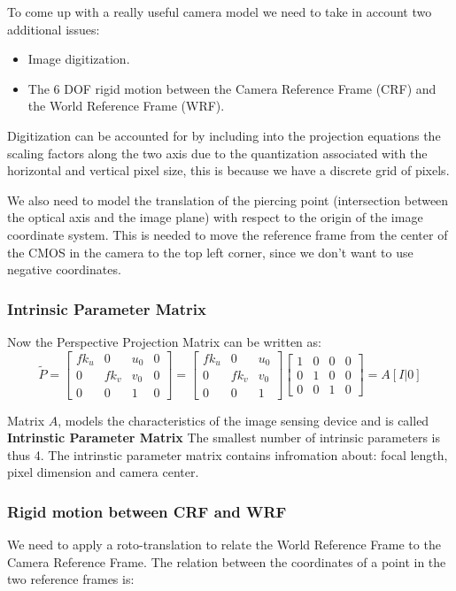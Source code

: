\documentclass{article}
\begin{document}
To come up with a really useful camera model we need to take in account two additional issues:
\begin{itemize}
  \item Image digitization.
  \item The 6 DOF rigid motion between the Camera Reference Frame (CRF) and the World Reference Frame (WRF).
\end{itemize}

Digitization can be accounted for by including into the projection equations the scaling factors along the two axis due to the quantization associated with the horizontal and vertical pixel size, this is because we have a discrete grid of pixels.

We also need to model the translation of the piercing point (intersection between the optical axis and the image plane) with respect to the origin of the image coordinate system.
This is needed to move the reference frame from the center of the CMOS in the camera to the top left corner, since we don't want to use negative coordinates.

\subsubsection{Intrinsic Parameter Matrix}
Now the Perspective Projection Matrix can be written as:
$$
\tilde{P} = 
\begin{bmatrix}
  fk_u & 0 & u_0 & 0 \\
  0 & fk_v & v_0 & 0 \\
  0 & 0 & 1 & 0 
\end{bmatrix}
=
\begin{bmatrix}
  fk_u & 0 & u_0 \\
  0 & fk_v & v_0 \\
  0 & 0 & 1 
\end{bmatrix}
\begin{bmatrix}
  1 & 0 & 0 & 0 \\
  0 & 1 & 0 & 0 \\
  0 & 0 & 1 & 0 
\end{bmatrix}
= A[I|0]
$$

Matrix $A$, models the characteristics of the image sensing device and is called \textbf{Intrinstic Parameter Matrix}
The smallest number of intrinsic parameters is thus 4.
The intrinstic parameter matrix contains infromation about: focal length, pixel dimension and camera center.

\subsubsection{Rigid motion between CRF and WRF}
We need to apply a roto-translation to relate the World Reference Frame to the Camera Reference Frame.
The relation between the coordinates of a point in the two reference frames is:
\end{document}
